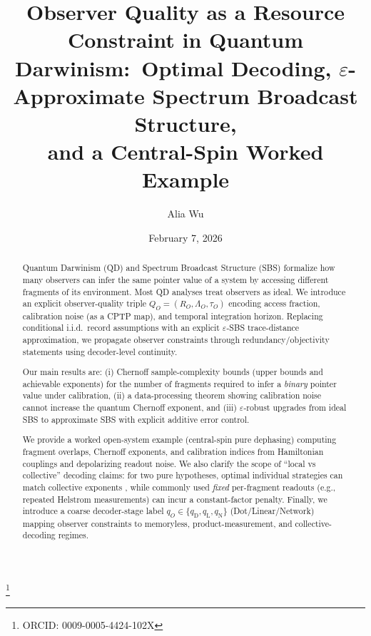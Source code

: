 \documentclass[aps,pra,twocolumn,superscriptaddress,nofootinbib]{revtex4-2}
\newcommand{\1}{\mathbf{1}}
\theoremstyle{definition}
\theoremstyle{plain}
\begin{document}
\title{Observer Quality as a Resource Constraint in Quantum Darwinism:\
Optimal Decoding, $\varepsilon$-Approximate Spectrum Broadcast Structure,\\
and a Central-Spin Worked Example}

\author{Alia Wu}\thanks{ORCID: 0009-0005-4424-102X}

\date{February 7, 2026}

\begin{abstract}
Quantum Darwinism (QD) and Spectrum Broadcast Structure (SBS) formalize how many observers can infer the same pointer value of a system by accessing different fragments of its environment.
Most QD analyses treat observers as ideal.
We introduce an explicit observer-quality triple $Q_O=(R_O,\Lambda_O,\tau_O)$ encoding access fraction, calibration noise (as a CPTP map), and temporal integration horizon.
Replacing conditional i.i.d.\ record assumptions with an explicit $\varepsilon$-SBS trace-distance approximation, we propagate observer constraints through redundancy/objectivity statements using decoder-level continuity.

Our main results are: (i) Chernoff sample-complexity bounds (upper bounds and achievable exponents) for the number of fragments required to infer a \emph{binary} pointer value under calibration, (ii) a data-processing theorem showing calibration noise cannot increase the quantum Chernoff exponent, and (iii) $\varepsilon$-robust upgrades from ideal SBS to approximate SBS with explicit additive error control.

We provide a worked open-system example (central-spin pure dephasing) computing fragment overlaps, Chernoff exponents, and calibration indices from Hamiltonian couplings and depolarizing readout noise.
We also clarify the scope of ``local vs collective'' decoding claims: for two pure hypotheses, optimal individual strategies can match collective exponents \cite{AcinBaganBaigMasanesMunozTapia2005}, while commonly used \emph{fixed} per-fragment readouts (e.g., repeated Helstrom measurements) can incur a constant-factor penalty.
Finally, we introduce a coarse decoder-stage label $q_O\in\{q_{\mathrm{D}},q_{\mathrm{L}},q_{\mathrm{N}}\}$ (Dot/Linear/Network) mapping observer constraints to memoryless, product-measurement, and collective-decoding regimes.
\end{abstract}

\maketitle
\end{document}
